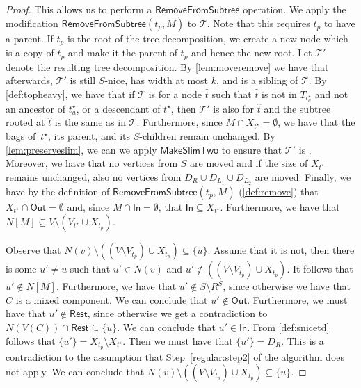 \documentclass[a4paper,UKenglish,cleveref, autoref, thm-restate, numberwithinsect]{lipics-v2021}
\newcounter{modification}
\newcounter{algorithm}
\newcommand{\slim}{\text{slim}\xspace}
\newcommand{\topheavy}{\text{top-heavy}\xspace}
\newcommand{\In}{\mathsf{In}}
\newcommand{\Out}{\mathsf{Out}}
\newcommand{\Rest}{\mathsf{Rest}}
\newcommand{\RemoveFromSubtree}{\mathsf{RemoveFromSubtree}}
\newcommand{\MakeSlimTwo}{\mathsf{MakeSlimTwo}}
\begin{document}
\begin{proof}
This allows us to perform a $\RemoveFromSubtree$ operation. We apply the modification $\RemoveFromSubtree(t_p,M)$ to $\mathcal{T}$. Note that this requires $t_p$ to have a parent. If $t_p$ is the root of the tree decomposition, we create a new node which is a copy of $t_p$ and make it the parent of $t_p$ and hence the new root.
        Let $\mathcal{T}'$ denote the resulting tree decomposition.
        By \cref{lem:moveremove} we have that afterwards, $\mathcal{T}'$ is still $S$-nice, has width at most $k$, and is a sibling of $\mathcal{T}$. 
        By \cref{def:topheavy}, we have that
        if $\mathcal{T}$ is \topheavy for a node $\hat{t}$ such that $\hat{t}$ is not in $T_{t^\star_a}$ and not an ancestor of $t^\star_a$, or
         a descendant of $t^\star$,
then $\mathcal{T}'$ is also \topheavy for $\hat{t}$ and the subtree rooted at $\hat{t}$ is the same as in $\mathcal{T}$.
Furthermore, since $M\cap X_{t^\star}=\emptyset$, we have that the bags of~$t^\star$, its parent, and its $S$-children remain unchanged. 
By \cref{lem:preserveslim}, we can we apply $\MakeSlimTwo$ to ensure that $\mathcal{T}'$ is \slim.
        Moreover, we have that no vertices from $S$ are moved and if the size of $X_{t^\star}$ remains unchanged, also no vertices from $D_R\cup D_{L_1}\cup D_{L_2}$ are moved.
Finally, we have by the definition of $\RemoveFromSubtree(t_p,M)$ (\cref{def:remove}) that $X_{t^\star}\cap \Out=\emptyset$ and, since $M\cap \In=\emptyset$, that $\In\subseteq X_{t^\star}$. Furthermore, we have that $N[M]\subseteq V\setminus (V_{t^\star}\cup X_{t_p})$.




 Observe that $N(v)\setminus ((V\setminus V_{t_p})\cup X_{t_p})\subseteq \{u\}$. Assume that it is not, then there is some $u'\neq u$ such that $u'\in N(v)$ and $u'\notin ((V\setminus V_{t_p})\cup X_{t_p})$. It follows that $u'\notin N[M]$. Furthermore, we have that $u'\notin S\setminus R^S$, since otherwise we have that $C$ is a mixed component. We can conclude that $u'\notin \Out$. 
     Furthermore, we must have that $u'\notin\Rest$, since otherwise we get a contradiction to $N(V(C))\cap \Rest\subseteq \{u\}$. We can conclude that $u'\in \In$. From \cref{def:snicetd} follows that $\{u'\}=X_{t_p}\setminus X_{t^\star}$. 
     Then we must have that $\{u'\}=D_{R}$.
This is a contradiction to the assumption that Step~\ref{regular:step2} of the algorithm does not apply.
We can conclude that $N(v)\setminus ((V\setminus V_{t_p})\cup X_{t_p})\subseteq \{u\}$.


\end{proof}
\end{document}

